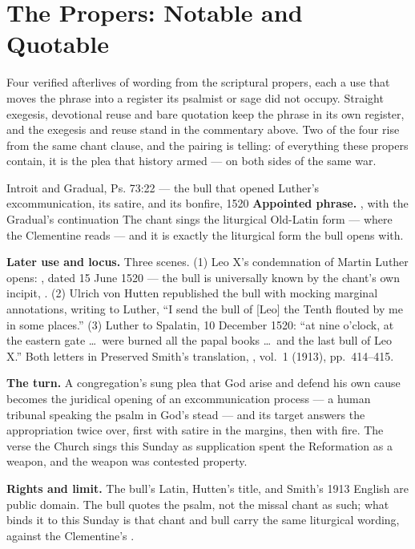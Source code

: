 \sectionguard
\section*{The Propers: Notable and Quotable}

Four verified afterlives of wording from the scriptural propers, each a use
that moves the phrase into a register its psalmist or sage did not occupy.
Straight exegesis, devotional reuse and bare quotation keep the phrase in its
own register, and the exegesis and reuse stand in the commentary above. Two of
the four rise from the same chant clause, and the pairing is telling: of
everything these
propers contain, it is the plea  that history armed --- on both sides of the same war.

\begin{afterlife}{Introit and Gradual, Ps. 73:22 --- the bull that opened Luther's excommunication, its satire, and its bonfire, 1520}
\textbf{Appointed phrase.} ,
with the Gradual's continuation  The chant sings the
liturgical Old-Latin form ---  where the Clementine reads
 --- and it is exactly the liturgical form the bull opens with.

\textbf{Later use and locus.} Three scenes. (1) Leo X's condemnation of
Martin Luther opens: ,
dated 15 June 1520 --- the bull is universally known by the chant's own
incipit, . (2) Ulrich von Hutten republished the bull
with mocking marginal annotations, writing to Luther, ``I send the bull of
[Leo] the Tenth flouted by me in some places.'' (3) Luther to Spalatin,
10 December 1520: ``at nine o'clock, at the eastern gate \dots\ were burned
all the papal books \dots\ and the last bull of Leo X.'' Both letters in
Preserved Smith's translation, , vol.~1 (1913),
pp.~414--415.

\textbf{The turn.} A congregation's sung plea that God arise and defend his
own cause becomes the juridical opening of an excommunication process --- a
human tribunal speaking the psalm in God's stead --- and its target answers
the appropriation twice over, first with satire in the margins, then with
fire. The verse the Church sings this Sunday as supplication spent the
Reformation as a weapon, and the weapon was contested property.

\textbf{Rights and limit.} The bull's Latin, Hutten's title, and Smith's 1913
English are public domain. The bull quotes the psalm, not the missal chant as
such; what binds it to this Sunday is that chant and bull carry the same
liturgical wording,  against the Clementine's .
\end{afterlife}

